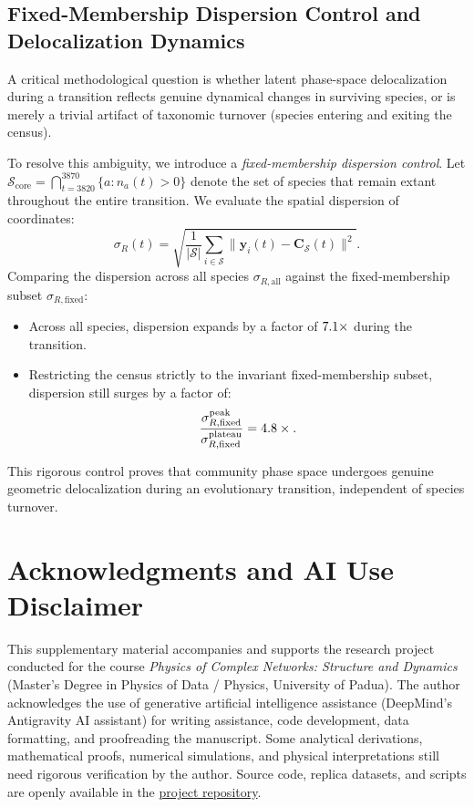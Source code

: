 \documentclass[11pt,a4paper]{article}
\begin{document}
\subsection{Fixed-Membership Dispersion Control and Delocalization Dynamics}

A critical methodological question is whether latent phase-space delocalization during a transition reflects genuine dynamical changes in surviving species, or is merely a trivial artifact of taxonomic turnover (species entering and exiting the census).

To resolve this ambiguity, we introduce a \emph{fixed-membership dispersion control}. Let $\mathcal{S}_{\mathrm{core}} = \bigcap_{t=3820}^{3870} \{a : n_a(t) > 0\}$ denote the set of species that remain extant throughout the entire transition. We evaluate the spatial dispersion of coordinates:
\begin{equation}
\sigma_R(t) = \sqrt{\frac{1}{|\mathcal{S}|} \sum_{i \in \mathcal{S}} \|\mathbf{y}_i(t) - \mathbf{C}_{\mathcal{S}}(t)\|^2}.
\end{equation}
Comparing the dispersion across all species $\sigma_{R, \mathrm{all}}$ against the fixed-membership subset $\sigma_{R, \mathrm{fixed}}$:
\begin{itemize}
\item Across all species, dispersion expands by a factor of $7.1\times$ during the transition.
\item Restricting the census strictly to the invariant fixed-membership subset, dispersion still surges by a factor of:
\begin{equation}
\frac{\sigma_{R, \mathrm{fixed}}^{\mathrm{peak}}}{\sigma_{R, \mathrm{fixed}}^{\mathrm{plateau}}} = 4.8\times.
\end{equation}
\end{itemize}
This rigorous control proves that community phase space undergoes genuine geometric delocalization during an evolutionary transition, independent of species turnover.

\section*{Acknowledgments and AI Use Disclaimer}
This supplementary material accompanies and supports the research project conducted for the course \emph{Physics of Complex Networks: Structure and Dynamics} (Master's Degree in Physics of Data / Physics, University of Padua). The author acknowledges the use of generative artificial intelligence assistance (DeepMind's Antigravity AI assistant) for writing assistance, code development, data formatting, and proofreading the manuscript. Some analytical derivations, mathematical proofs, numerical simulations, and physical interpretations still need rigorous verification by the author. Source code, replica datasets, and scripts are openly available in the \href{https://github.com/filippobezzi/PoCN_projects}{project repository}.



\end{document}

